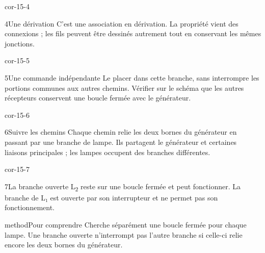 \documentclass[12pt,twoside,openany]{book}
\begin{document}
\begin{blocLivre}{cor-15-4}
\begin{corrige}{4}{Une dérivation}
C’est une association en dérivation. La propriété vient des connexions ; les fils peuvent être dessinés autrement tout en conservant les mêmes jonctions.\par
{}
\end{corrige}\end{blocLivre}
\begin{blocLivre}{cor-15-5}
\begin{corrige}{5}{Une commande indépendante}
Le placer dans cette branche, sans interrompre les portions communes aux autres chemins. Vérifier sur le schéma que les autres récepteurs conservent une boucle fermée avec le générateur.\par
{}
\end{corrige}\end{blocLivre}
\begin{blocLivre}{cor-15-6}
\begin{corrige}{6}{Suivre les chemins}
Chaque chemin relie les deux bornes du générateur en passant par une branche de lampe. Ils partagent le générateur et certaines liaisons principales ; les lampes occupent des branches différentes.\par
{}
\end{corrige}\end{blocLivre}
\begin{blocLivre}{cor-15-7}
\begin{corrige}{7}{La branche ouverte}
L\textsubscript{2} reste sur une boucle fermée et peut fonctionner. La branche de L₁ est ouverte par son interrupteur et ne permet pas son fonctionnement.\par
\begin{pcEncadre}{method}{Pour comprendre}
Cherche séparément une boucle fermée pour chaque lampe. Une branche ouverte n’interrompt pas l’autre branche si celle-ci relie encore les deux bornes du générateur.\par
\end{pcEncadre}
\end{corrige}\end{blocLivre}
\end{document}

